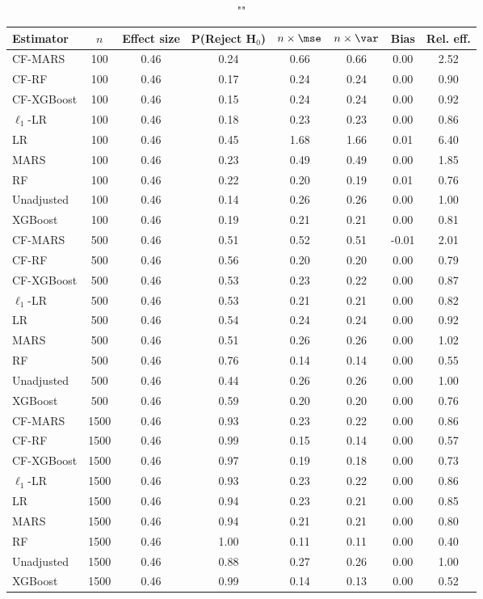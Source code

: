 \begin{table}
\centering
\caption{""}
\begin{tabular}{lccccccc}
\toprule
Estimator & $n$ & Effect size & P(Reject H$_0$) & $n\times\mse$ & $n\times \var$ & Bias & Rel. eff.\\ \midrule
CF-MARS & 100 & 0.46 & 0.24 & 0.66 & 0.66 &  0.00 & 2.52 \\ 
CF-RF & 100 & 0.46 & 0.17 & 0.24 & 0.24 &  0.00 & 0.90 \\ 
CF-XGBoost & 100 & 0.46 & 0.15 & 0.24 & 0.24 &  0.00 & 0.92 \\ 
$\ell_1$-LR & 100 & 0.46 & 0.18 & 0.23 & 0.23 &  0.00 & 0.86 \\ 
LR & 100 & 0.46 & 0.45 & 1.68 & 1.66 &  0.01 & 6.40 \\ 
MARS & 100 & 0.46 & 0.23 & 0.49 & 0.49 &  0.00 & 1.85 \\ 
RF & 100 & 0.46 & 0.22 & 0.20 & 0.19 &  0.01 & 0.76 \\ 
Unadjusted & 100 & 0.46 & 0.14 & 0.26 & 0.26 &  0.00 & 1.00 \\ 
XGBoost & 100 & 0.46 & 0.19 & 0.21 & 0.21 &  0.00 & 0.81 \\ \addlinespace 
CF-MARS & 500 & 0.46 & 0.51 & 0.52 & 0.51 & -0.01 & 2.01 \\ 
CF-RF & 500 & 0.46 & 0.56 & 0.20 & 0.20 &  0.00 & 0.79 \\ 
CF-XGBoost & 500 & 0.46 & 0.53 & 0.23 & 0.22 &  0.00 & 0.87 \\ 
$\ell_1$-LR & 500 & 0.46 & 0.53 & 0.21 & 0.21 &  0.00 & 0.82 \\ 
LR & 500 & 0.46 & 0.54 & 0.24 & 0.24 &  0.00 & 0.92 \\ 
MARS & 500 & 0.46 & 0.51 & 0.26 & 0.26 &  0.00 & 1.02 \\ 
RF & 500 & 0.46 & 0.76 & 0.14 & 0.14 &  0.00 & 0.55 \\ 
Unadjusted & 500 & 0.46 & 0.44 & 0.26 & 0.26 &  0.00 & 1.00 \\ 
XGBoost & 500 & 0.46 & 0.59 & 0.20 & 0.20 &  0.00 & 0.76 \\ \addlinespace 
CF-MARS & 1500 & 0.46 & 0.93 & 0.23 & 0.22 &  0.00 & 0.86 \\ 
CF-RF & 1500 & 0.46 & 0.99 & 0.15 & 0.14 &  0.00 & 0.57 \\ 
CF-XGBoost & 1500 & 0.46 & 0.97 & 0.19 & 0.18 &  0.00 & 0.73 \\ 
$\ell_1$-LR & 1500 & 0.46 & 0.93 & 0.23 & 0.22 &  0.00 & 0.86 \\ 
LR & 1500 & 0.46 & 0.94 & 0.23 & 0.21 &  0.00 & 0.85 \\ 
MARS & 1500 & 0.46 & 0.94 & 0.21 & 0.21 &  0.00 & 0.80 \\ 
RF & 1500 & 0.46 & 1.00 & 0.11 & 0.11 &  0.00 & 0.40 \\ 
Unadjusted & 1500 & 0.46 & 0.88 & 0.27 & 0.26 &  0.00 & 1.00 \\ 
XGBoost & 1500 & 0.46 & 0.99 & 0.14 & 0.13 &  0.00 & 0.52 \\
\bottomrule
\end{tabular}
\end{table}

